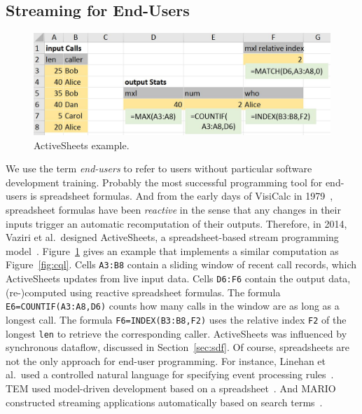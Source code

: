 \subsection{Streaming for End-Users}\label{sec:eup} %

\begin{figure}[!h]
\centerline{\includegraphics[width=\columnwidth]{CallStats.jpg}}
\vspace*{-4mm}
\caption{\label{fig:activesheets}ActiveSheets example.}
\end{figure}

We use the term \emph{end-users} to refer to users without particular
software development training. Probably the most successful
programming tool for end-users is spreadsheet formulas. And from the
early days of VisiCalc in 1979~\cite{bricklin_frankston_1979},
spreadsheet formulas have been \emph{reactive} in the sense that any
changes in their inputs trigger an automatic recomputation of their
outputs. Therefore, in 2014, Vaziri et al.\ designed \textsf{ActiveSheets}, a
spreadsheet-based stream programming model~\cite{vaziri_et_al_2014,hirzel_et_al_2016}.
Figure~\ref{fig:activesheets} gives an example that implements a
similar computation as Figure~\ref{fig:cql}.
Cells \lstinline{A3:B8} contain a sliding window of recent call
records, which ActiveSheets updates from live input data. Cells
\lstinline{D6:F6} contain the output data, \mbox{(re-)}com\-pu\-ted
using reactive spreadsheet formulas. The formula
\mbox{\lstinline{E6=COUNTIF(A3:A8,D6)}} counts how many calls in the
window are as long as a longest call. The formula
\mbox{\lstinline{F6=INDEX(B3:B8,F2)}} uses the relative index \lstinline{F2}
of the longest \lstinline{len} to retrieve the corresponding
caller.  ActiveSheets was influenced by
synchronous dataflow, discussed in Section~\ref{sec:sdf}.
%
Of course, spreadsheets are not the
only approach for end-user programming. For instance, Linehan et al.\ used a
controlled natural language for specifying event processing
rules~\cite{linehan_et_al_2011}. \textsf{TEM} used model-driven development
based on a spreadsheet~\cite{etzion_et_al_2016}. And \textsf{MARIO}
constructed streaming applications automatically based on
search terms~\cite{riabov_et_al_2008}.
